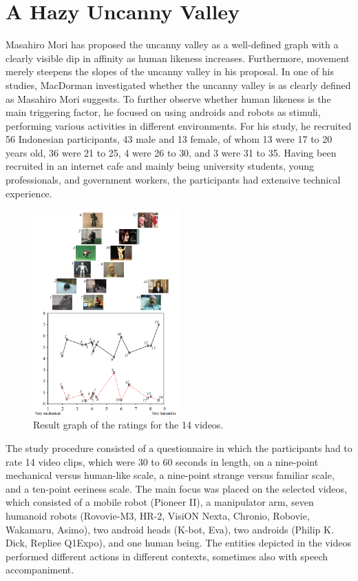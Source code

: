 \section{A Hazy Uncanny Valley}
Masahiro Mori has proposed the uncanny valley as a well-defined graph with a clearly visible dip in affinity as human likeness increases. Furthermore, movement merely steepens the slopes of the uncanny valley in his proposal.
In one of his studies, MacDorman \cite{uncanny_ambiguous} investigated whether the uncanny valley is as clearly defined as Masahiro Mori suggests. To further observe whether human likeness is the main triggering factor, he focused on using androids and robots as stimuli, performing various activities in different environments. For his study, he recruited 56 Indonesian participants, 43 male and 13 female, of whom 13 were 17 to 20 years old, 36 were 21 to 25, 4 were 26 to 30, and 3 were 31 to 35. Having been recruited in an internet cafe and mainly being university students, young professionals, and government workers, the participants had extensive technical experience.\newpage
\begin{figure} %
    \centering
    \includegraphics[width=0.5\textwidth]{graphics/hazy_uncanny.png}
    \caption{Result graph of the ratings for the 14 videos.}
    \label{fig:hazyUncanny}
\end{figure}
The study procedure consisted of a questionnaire in which the participants had to rate 14 video clips, which were 30 to 60 seconds in length, on a nine-point mechanical versus human-like scale, a nine-point strange versus familiar scale, and a
ten-point eeriness scale. The main focus was placed on the selected videos, which consisted of a mobile robot (Pioneer II), a manipulator arm, seven humanoid robots (Rovovie-M3, HR-2, VisiON Nexta, Chronio, Robovie, Wakamaru, Asimo), two android heads (K-bot, Eva), two androids (Philip K. Dick, Repliee Q1Expo), and one human being. The entities depicted in the videos performed different actions in different contexts, sometimes also with speech accompaniment.\\
